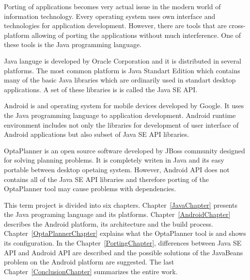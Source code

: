 Porting of applications becomes very actual issue in the modern world of information technology. Every operating system uses own interface and technologies for application development. However, there are tools that are cross-platform allowing of porting the applications without much interference. One of these tools is the Java programming language.

Java languge is developed by Oracle Corporation and it is distributed in several platforms. The most common platform is Java Standart Edition which contains many of the basic Java libraries which are ordinarily used in standart desktop applications. A set of these libraries is is called the Java SE API.

Android is and operating system for mobile devices developed by Google. It uses the Java programming language to application development. Android runtime environment includes not only the libraries for development of user interface of Android applications but also subset of Java SE API libraries.

OptaPlanner is an open source software developed by JBoss community designed for solving planning problems. It is completely writen in Java and its easy portable between desktop opetaing system. However, Android API does not contains all of the Java SE API libraries and therefore porting of the OptaPlanner tool may cause problems with dependencies.

This term project is divided into six chapters. Chapter~\ref{JavaChapter} presents the Java programing language and its platforms. Chapter~\ref{AndroidChapter} describes the Android platform, its architecture and the build process. Chapter~\ref{OptaPlannerChapter} explains what the OptaPlanner tool is and shows its configuration. In the Chapter~\ref{PortingChapter}, differences between Java SE API and Android API are described and the possible solutions of the JavaBeans problem on the Android platform are suggested. The last Chapter~\ref{ConclusionChapter} summarizes the entire work.

